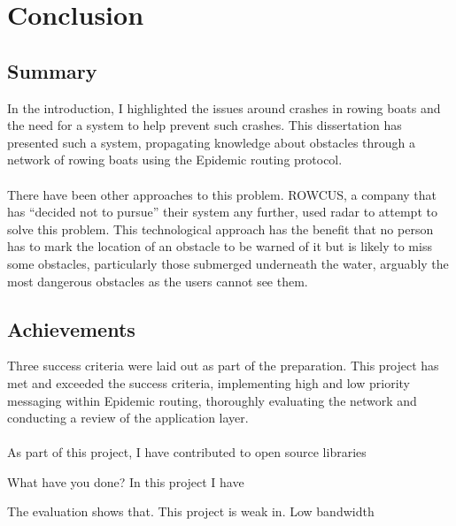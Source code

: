 \documentclass[12pt,a4paper]{report}
\newcommand{\newchapter}[2]{
    \setcounter{chapter}{#1}
    \setcounter{section}{0}
    \chapter*{#2}
    \addcontentsline{toc}{chapter}{#1 #2}
}
\begin{document}
{%
\newchapter{5}{Conclusion}

\section{Summary}
In the introduction, I highlighted the issues around crashes in rowing boats and the need for a system to help prevent such crashes. This dissertation has presented such a system, propagating knowledge about obstacles through a network of rowing boats using the Epidemic routing protocol. \\ \\ 
There have been other approaches to this problem. ROWCUS, a company that has ``decided not to pursue'' their system any further, used radar to attempt to solve this problem. This technological approach has the benefit that no person has to mark the location of an obstacle to be warned of it but is likely to miss some obstacles, particularly those submerged underneath the water, arguably the most dangerous obstacles as the users cannot see them. 

\section{Achievements}
Three success criteria were laid out as part of the preparation. This project has met and exceeded the success criteria, implementing high and low priority messaging within Epidemic routing, thoroughly evaluating the network and conducting a review of the application layer. \\ \\ 
As part of this project, I have contributed to open source libraries

What have you done?
In this project I have 

The evaluation shows that. This project is weak in. Low bandwidth

}
\end{document}
